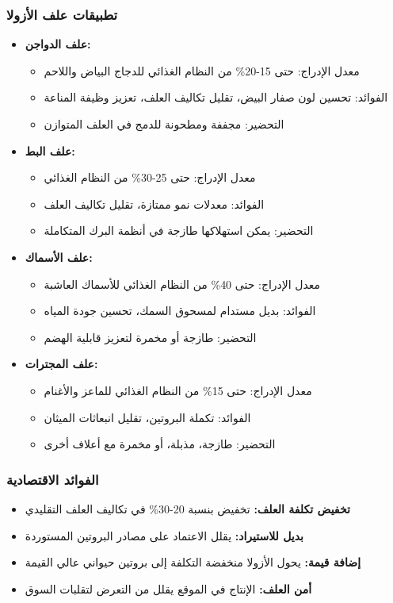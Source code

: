 \subsubsection{تطبيقات علف الأزولا}
\begin{itemize}
    \item \textbf{علف الدواجن:}
    \begin{itemize}
        \item معدل الإدراج: حتى 15-20\% من النظام الغذائي للدجاج البياض واللاحم
        \item الفوائد: تحسين لون صفار البيض، تقليل تكاليف العلف، تعزيز وظيفة المناعة
        \item التحضير: مجففة ومطحونة للدمج في العلف المتوازن
    \end{itemize}
    
    \item \textbf{علف البط:}
    \begin{itemize}
        \item معدل الإدراج: حتى 25-30\% من النظام الغذائي
        \item الفوائد: معدلات نمو ممتازة، تقليل تكاليف العلف
        \item التحضير: يمكن استهلاكها طازجة في أنظمة البرك المتكاملة
    \end{itemize}
    
    \item \textbf{علف الأسماك:}
    \begin{itemize}
        \item معدل الإدراج: حتى 40\% من النظام الغذائي للأسماك العاشبة
        \item الفوائد: بديل مستدام لمسحوق السمك، تحسين جودة المياه
        \item التحضير: طازجة أو مخمرة لتعزيز قابلية الهضم
    \end{itemize}
    
    \item \textbf{علف المجترات:}
    \begin{itemize}
        \item معدل الإدراج: حتى 15\% من النظام الغذائي للماعز والأغنام
        \item الفوائد: تكملة البروتين، تقليل انبعاثات الميثان
        \item التحضير: طازجة، مذبلة، أو مخمرة مع أعلاف أخرى
    \end{itemize}
\end{itemize}

\subsubsection{الفوائد الاقتصادية}
\begin{itemize}
    \item \textbf{تخفيض تكلفة العلف:} تخفيض بنسبة 20-30\% في تكاليف العلف التقليدي
    \item \textbf{بديل للاستيراد:} يقلل الاعتماد على مصادر البروتين المستوردة
    \item \textbf{إضافة قيمة:} يحول الأزولا منخفضة التكلفة إلى بروتين حيواني عالي القيمة
    \item \textbf{أمن العلف:} الإنتاج في الموقع يقلل من التعرض لتقلبات السوق
\end{itemize}

